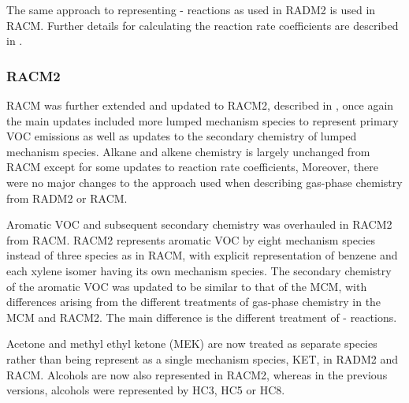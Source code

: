 The same approach to representing - reactions as used in RADM2 is used in RACM. 
Further details for calculating the reaction rate coefficients are described in \citet{Kirchner:1996}.

\subsubsection{RACM2}
RACM was further extended and updated to RACM2, described in \citet{Goliff:2013}, once again the main updates included more lumped mechanism species to represent primary VOC emissions as well as updates to the secondary chemistry of lumped mechanism species.
Alkane and alkene chemistry is largely unchanged from RACM except for some updates to reaction rate coefficients,
Moreover, there were no major changes to the approach used when describing gas-phase chemistry from RADM2 or RACM.

Aromatic VOC and subsequent secondary chemistry was overhauled in RACM2 from RACM.
RACM2 represents aromatic VOC by eight mechanism species instead of three species as in RACM, with explicit representation of benzene and each xylene isomer having its own mechanism species.
The secondary chemistry of the aromatic VOC was updated to be similar to that of the MCM, with differences arising from the different treatments of gas-phase chemistry in the MCM and RACM2.
The main difference is the different treatment of - reactions.

Acetone and methyl ethyl ketone (MEK) are now treated as separate species rather than being represent as a single mechanism species, KET, in RADM2 and RACM.
Alcohols are now also represented in RACM2, whereas in the previous versions, alcohols were represented by HC3, HC5 or HC8.

